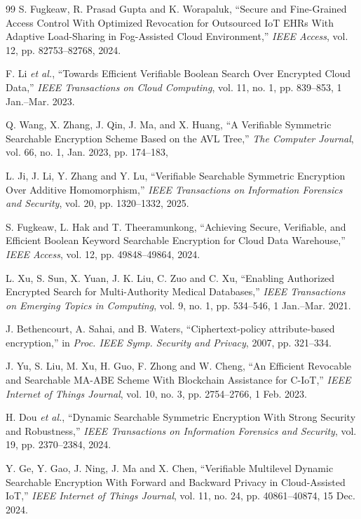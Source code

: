 \documentclass{ieeetj}
\theoremstyle{ieee-style}
\begin{document}
\begin{thebibliography}{99}
S. Fugkeaw, R. Prasad Gupta and K. Worapaluk, “Secure and Fine-Grained Access Control With Optimized Revocation for Outsourced IoT EHRs With Adaptive Load-Sharing in Fog-Assisted Cloud Environment,” \emph{IEEE Access}, vol. 12, pp. 82753–82768, 2024.

F. Li \emph{et al.}, “Towards Efficient Verifiable Boolean Search Over Encrypted Cloud Data,” \emph{IEEE Transactions on Cloud Computing}, vol. 11, no. 1, pp. 839–853, 1 Jan.–Mar. 2023.

Q. Wang, X. Zhang, J. Qin, J. Ma, and X. Huang, “A Verifiable Symmetric Searchable Encryption Scheme Based on the AVL Tree,” \emph{The Computer Journal}, vol. 66, no. 1, Jan. 2023, pp. 174–183, 

L. Ji, J. Li, Y. Zhang and Y. Lu, “Verifiable Searchable Symmetric Encryption Over Additive Homomorphism,” \emph{IEEE Transactions on Information Forensics and Security}, vol. 20, pp. 1320–1332, 2025.

S. Fugkeaw, L. Hak and T. Theeramunkong, “Achieving Secure, Verifiable, and Efficient Boolean Keyword Searchable Encryption for Cloud Data Warehouse,” \emph{IEEE Access}, vol. 12, pp. 49848–49864, 2024.

L. Xu, S. Sun, X. Yuan, J. K. Liu, C. Zuo and C. Xu, “Enabling Authorized Encrypted Search for Multi-Authority Medical Databases,” \emph{IEEE Transactions on Emerging Topics in Computing}, vol. 9, no. 1, pp. 534–546, 1 Jan.–Mar. 2021.

J. Bethencourt, A. Sahai, and B. Waters, “Ciphertext-policy attribute-based encryption,” in \emph{Proc. IEEE Symp. Security and Privacy}, 2007, pp. 321–334.

J. Yu, S. Liu, M. Xu, H. Guo, F. Zhong and W. Cheng, “An Efficient Revocable and Searchable MA-ABE Scheme With Blockchain Assistance for C-IoT,” \emph{IEEE Internet of Things Journal}, vol. 10, no. 3, pp. 2754–2766, 1 Feb. 2023.

H. Dou \emph{et al.}, “Dynamic Searchable Symmetric Encryption With Strong Security and Robustness,” \emph{IEEE Transactions on Information Forensics and Security}, vol. 19, pp. 2370–2384, 2024.

Y. Ge, Y. Gao, J. Ning, J. Ma and X. Chen, “Verifiable Multilevel Dynamic Searchable Encryption With Forward and Backward Privacy in Cloud-Assisted IoT,” \emph{IEEE Internet of Things Journal}, vol. 11, no. 24, pp. 40861–40874, 15 Dec. 2024.


\end{thebibliography}
\end{document}
